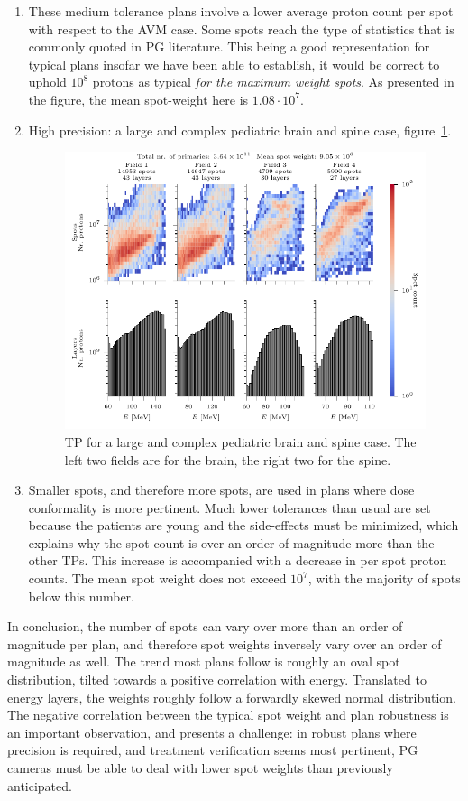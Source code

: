 \documentclass[a4paper,english]{article}
\begin{document}
\begin{enumerate}[noitemsep]
\item[] These medium tolerance plans involve a lower average proton count per spot with respect to the AVM case. Some spots reach the type of statistics that is commonly quoted in PG literature. This being a good representation for typical plans insofar we have been able to establish, it would be correct to uphold $10^8$ protons as typical \emph{for the maximum weight spots}. As presented in the figure, the mean spot-weight here is $1.08\cdot10^7$.

\item High precision: a large and complex pediatric brain and spine case, figure~\ref{fig:planhigh}.

\begin{figure}[htp]
  \centering
  \includegraphics[width=0.8\linewidth]{CSI_F1nonorm-plot}
  \caption{TP for a large and complex pediatric brain and spine case. The left two fields are for the brain, the right two for the spine.}
  \label{fig:planhigh}
\end{figure}

\item[] Smaller spots, and therefore more spots, are used in plans where dose conformality is more pertinent. Much lower tolerances than usual are set because the patients are young and the side-effects must be minimized, which explains why the spot-count is over an order of magnitude more than the other TPs. This increase is accompanied with a decrease in per spot proton counts. The mean spot weight does not exceed $10^7$, with the majority of spots below this number.
\end{enumerate}

In conclusion, the number of spots can vary over more than an order of magnitude per plan, and therefore spot weights inversely vary over an order of magnitude as well. The trend most plans follow is roughly an oval spot distribution, tilted towards a positive correlation with energy. Translated to energy layers, the weights roughly follow a forwardly skewed normal distribution. The negative correlation between the typical spot weight and plan robustness is an important observation, and presents a challenge: in robust plans where precision is required, and treatment verification seems most pertinent, PG cameras must be able to deal with lower spot weights than previously anticipated. 
\end{document}
